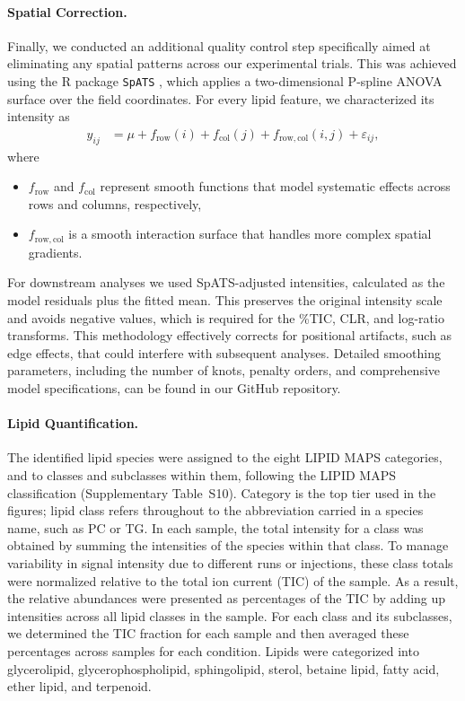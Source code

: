 \documentclass[9pt,twocolumn,twoside]{rilabRxiv}
\begin{document}
\paragraph{Spatial Correction.}
Finally, we conducted an additional quality control step specifically aimed at eliminating any spatial patterns across our experimental trials. This was achieved using the R package \texttt{SpATS} \citep{RodriguezAlvarez2018}, which applies a two-dimensional P-spline ANOVA surface over the field coordinates. For every lipid feature, we characterized its intensity as
\begin{align}
  y_{ij} &= \mu + f_{\mathrm{row}}(i) + f_{\mathrm{col}}(j) + f_{\mathrm{row,col}}(i,j) + \varepsilon_{ij},
\end{align}
where
\begin{itemize}
  \item $f_{\mathrm{row}}$ and $f_{\mathrm{col}}$ represent smooth functions that model systematic effects across rows and columns, respectively,
  \item $f_{\mathrm{row,col}}$ is a smooth interaction surface that handles more complex spatial gradients.
\end{itemize}
For downstream analyses we used SpATS-adjusted intensities, calculated as the model residuals plus the fitted mean. This preserves the original intensity scale and avoids negative values, which is required for the \%TIC, CLR, and log-ratio transforms. This methodology effectively corrects for positional artifacts, such as edge effects, that could interfere with subsequent analyses. Detailed smoothing parameters, including the number of knots, penalty orders, and comprehensive model specifications, can be found in our GitHub repository.

\paragraph{Lipid Quantification.}
The identified lipid species were assigned to the eight LIPID MAPS categories, and to classes and subclasses within them, following the LIPID MAPS classification \citep{Fahy2009LipidMapsClass} (Supplementary Table~S10). Category is the top tier used in the figures; lipid class refers throughout to the abbreviation carried in a species name, such as PC or TG. In each sample, the total intensity for a class was obtained by summing the intensities of the species within that class. To manage variability in signal intensity due to different runs or injections, these class totals were normalized relative to the total ion current (TIC) of the sample. As a result, the relative abundances were presented as percentages of the TIC by adding up intensities across all lipid classes in the sample. For each class and its subclasses, we determined the TIC fraction for each sample and then averaged these percentages across samples for each condition. Lipids were categorized into glycerolipid, glycerophospholipid, sphingolipid, sterol, betaine lipid, fatty acid, ether lipid, and terpenoid.
\end{document}
